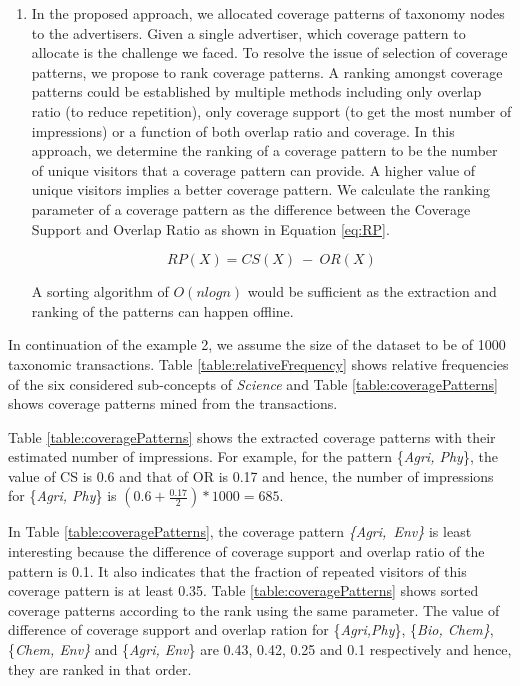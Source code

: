 \begin{enumerate}[label=(\Alph*)]
\item In the proposed approach, we allocated coverage patterns of taxonomy nodes to the advertisers. Given a single advertiser, which coverage pattern to allocate is the challenge we faced. To resolve the issue of selection of coverage patterns, we propose to rank coverage patterns. A ranking amongst coverage patterns could be established by multiple methods including only overlap ratio (to reduce repetition), only coverage support (to get the most number of impressions) or a function of both overlap ratio and coverage. In this approach, we determine the ranking of a coverage pattern to be the number of unique visitors that a coverage pattern can provide. A higher value of unique visitors implies a better coverage pattern. We calculate the ranking parameter of a coverage pattern as the difference between the Coverage Support and Overlap Ratio as shown in Equation \ref{eq:RP}. 

\begin{equation}
\label{eq:RP}
RP(X) = CS(X)\ -\ OR(X)
\end{equation}

A sorting algorithm of $O (nlogn)$ would be sufficient as the extraction and ranking of the patterns can happen offline.


\end{enumerate}






In continuation of the example 2, we assume the size of the dataset to be of 1000 taxonomic transactions. Table \ref{table:relativeFrequency} shows relative frequencies of the six considered sub-concepts of {\it Science} and Table \ref{table:coveragePatterns} shows coverage patterns mined from the transactions.\par

Table \ref{table:coveragePatterns} shows the extracted coverage patterns with their estimated number of impressions. For example, for the pattern \{{\it Agri, Phy}\}, the value of CS is 0.6 and that of OR is 0.17 and hence, the number of impressions for \{{\it Agri, Phy}\} is $(0.6 +\frac{0.17}{2})* 1000 = 685$.

In  Table \ref{table:coveragePatterns}, the coverage pattern {\it\{Agri,\ Env\}} is least interesting because the difference of coverage support and overlap ratio of the pattern is 0.1. It also indicates that the fraction of repeated visitors of this coverage pattern is at least 0.35. Table \ref{table:coveragePatterns} shows sorted coverage patterns according to the rank using the same parameter. The value of difference of coverage support and overlap ration for \{{\it Agri,Phy}\}, \{{\it Bio, Chem\}}, \{{\it Chem, Env\}} and \{{\it Agri, Env}\} are 0.43, 0.42, 0.25 and 0.1 respectively and hence, they are ranked in that order.
 


